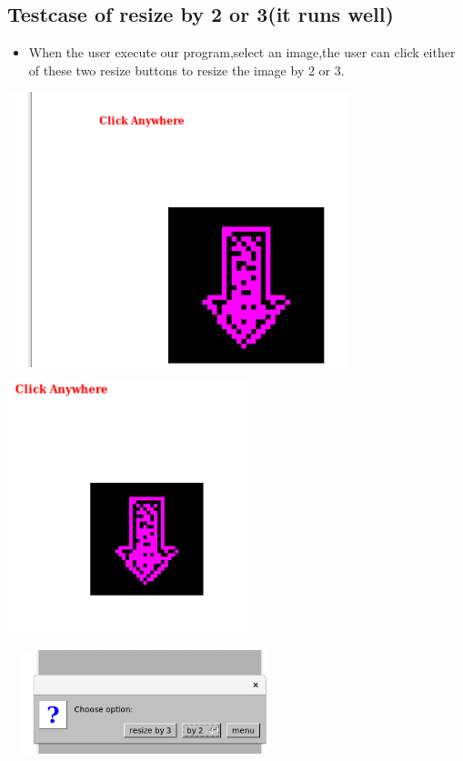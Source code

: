 \documentclass{article}
\begin{document}
\subsection*{Testcase of resize by 2 or 3(it runs well)}
\begin{itemize}
	\item When the user execute our program,select an image,the user can click either of these two resize buttons to resize the image by 2 or 3.
\end{itemize}
\includegraphics[width = 10cm, height = 8cm]{r3.png}
\includegraphics[width = 7cm, height = 8cm]{r2.png}
\includegraphics[width = 8cm, height = 3cm]{5.png}
\newpage
\end{document}
